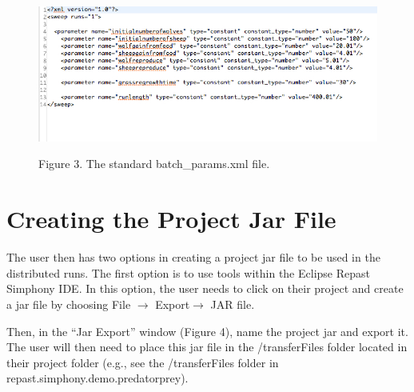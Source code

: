 \documentclass[12pt]{article}
\begin{document}
\begin{figure}[!t]
\begin{center}
\includegraphics[width=\textwidth]{images/Figure3.jpg}
\label{cablehealth}
\begin{minipage}{.9\textwidth}Figure 3. The standard batch\_params.xml file.
\end{minipage}
\end{center}
\end{figure}

\section{Creating the Project Jar File}

The user then has two options in creating a project jar file to be
used in the distributed runs. The first option is to use tools within
the Eclipse Repast Simphony IDE. In this option, the user needs to
click on their project and create a jar file by choosing File $\rightarrow{}$ Export$ \rightarrow{}$ JAR file.

Then, in the ``Jar Export'' window (Figure 4), name the project jar
and export it. The user will then need to place this jar file in the
/transferFiles folder located in their project folder (e.g.,
see the /transferFiles folder in repast.simphony.demo.predatorprey).
\end{document}
